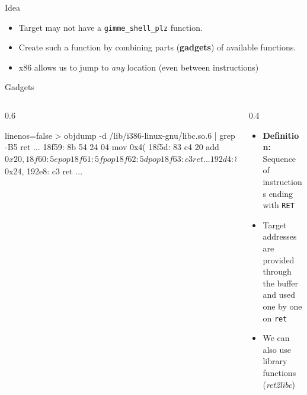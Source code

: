 \documentclass[beamer]{uibk}
\begin{document}
\begin{frame}{Idea}
    \begin{itemize}
        \item Target may not have a \texttt{gimme\_shell\_plz} function.
        \bigskip
        \pause
        \item Create such a function by combining parts (\textbf{gadgets}) of
            available functions.
        \bigskip
        \item x86 allows us to jump to \emph{any} location (even between
            instructions)
    \end{itemize}
\end{frame}

\begin{frame}[fragile]{Gadgets}
    \begin{columns}
        \begin{column}{0.6\textwidth}
            \begin{code*}{linenos=false}
                > objdump -d /lib/i386-linux-gnu/libc.so.6 | grep -B5 ret
                  ...
                18f59:       8b 54 24 04             mov    0x4(%
                18f5d:       83 c4 20                add    $0x20,%
                18f60:       5e                      pop    %
                18f61:       5f                      pop    %
                18f62:       5d                      pop    %
                18f63:       c3                      ret
                  ...
                192d4:       8b 54 24 2c             mov    0x2c(%
                192d8:       e8 23 fc ff ff          call   18f00 <__floatdidf+0x30>
                192dd:       8b 44 24 18             mov    0x18(%
                192e1:       8b 54 24 1c             mov    0x1c(%
                192e5:       83 c4 24                add    $0x24,%
                192e8:       c3                      ret
                  ...
            \end{code*}
        \end{column}
        \begin{column}{0.4\textwidth}
            \begin{itemize}
                \item \textbf{Definition:} Sequence of instructions ending with
                    \texttt{RET}
                \bigskip
                \item Target addresses are provided through the buffer and used
                    one by one on \texttt{ret}
                \bigskip
                \item We can also use library functions (\textit{ret2libc})
            \end{itemize}
        \end{column}
    \end{columns}
\end{frame}
\end{document}

